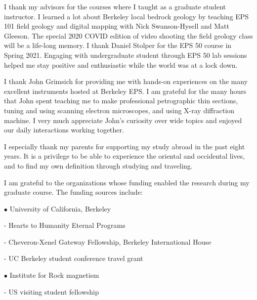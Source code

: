 \documentclass{ucbthesis}
\begin{document}
\begin{frontmatter}
\begin{acknowledgements}
I thank my advisors for the courses where I taught as a graduate student instructor. I learned a lot about Berkeley local bedrock geology by teaching EPS 101 field geology and digital mapping with Nick Swanson-Hysell and Matt Gleeson. The special 2020 COVID edition of video shooting the field geology class will be a life-long memory. I thank Daniel Stolper for the EPS 50 course in Spring 2021. Engaging with undergraduate student through EPS 50 lab sessions helped me stay positive and enthusiastic while the world was at a lock down. 

I thank John Grimsich for providing me with hands-on experiences on the many excellent instruments hosted at Berkeley EPS. I am grateful for the many hours that John spent teaching me to make professional petrographic thin sections, tuning and using scanning electron microscopes, and using X-ray diffraction machine. I very much appreciate John's curiosity over wide topics and enjoyed our daily interactions working together. 

I especially thank my parents for supporting my study abroad in the past eight years. It is a privilege to be able to experience the oriental and occidental lives, and to find my own definition through studying and traveling. 

I am grateful to the organizations whose funding enabled the research during my graduate course. The funding sources include:

\vspace{5mm}
$\bullet$ University of California, Berkeley
    \vspace{5mm}

    \hspace{\parindent} - Hearts to Humanity Eternal Programs
    \vspace{5mm}
    
    \hspace{\parindent} - Cheveron-Xenel Gateway Fellowship, Berkeley International House
    \vspace{5mm}
    
    \hspace{\parindent} - UC Berkeley student conference travel grant
\vspace{5mm}

$\bullet$ Institute for Rock magnetism
    \vspace{5mm}
    
    \hspace{\parindent} - US visiting student fellowship
    \vspace{5mm}
    

\end{acknowledgements}
\end{frontmatter}
\end{document}
